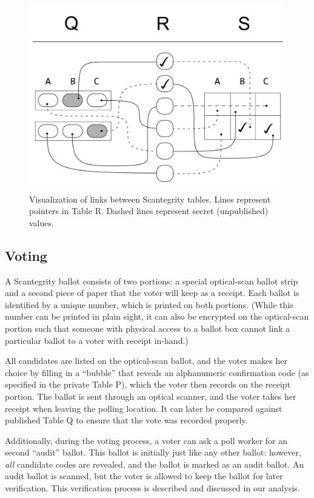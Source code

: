 \documentclass[10pt,twocolumn]{article}
\begin{document}
\begin{figure}
	\center
	\includegraphics[width=\columnwidth]{images/include/scantegrity.pdf}
	\caption{
		Visualization of links between Scantegrity tables.
		Lines represent pointers in Table R.
		Dashed lines represent secret (unpublished) values.
	}
	\label{fig:scantegrity}
\end{figure}

\subsection{Voting}

A Scantegrity ballot consists of two portions: a special optical-scan ballot strip and a second
piece of paper that the voter will keep as a receipt. Each ballot is identified by a unique number,
which is printed on both portions. (While this number can be printed in plain sight, it can also be
encrypted on the optical-scan portion such that someone with physical access to a ballot box cannot
link a particular ballot to a voter with receipt in-hand.)

All candidates are listed on the optical-scan ballot, and the voter makes her choice by filling
in a ``bubble'' that reveals an alphanumeric confirmation code (as specified in the private Table
P), which the voter then records on the receipt portion. The ballot is sent through an optical
scanner, and the voter takes her receipt when leaving the polling location. It can later be
compared against published Table Q to ensure that the vote was recorded properly.

Additionally, during the voting process, a voter can ask a poll worker for an second ``audit''
ballot. This ballot is initially just like any other ballot: however, \emph{all} candidate codes are
revealed, and the ballot is marked as an audit ballot. An audit ballot is scanned, but the voter is
allowed to keep the ballot for later verification. This verification process is described and
discussed in our analysis.
\end{document}
